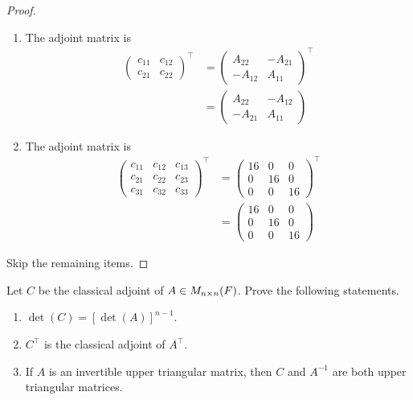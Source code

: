 \begin{proof} \ 

\begin{enumerate}
\item The adjoint matrix is
\begin{align*}
    \begin{pmatrix} c_{11} & c_{12} \\ c_{21} & c_{22} \end{pmatrix}^\top
        & = \begin{pmatrix} A_{22} & -A_{21} \\ -A_{12} & A_{11} \end{pmatrix}^\top \\
        & = \begin{pmatrix} A_{22} & -A_{12} \\ -A_{21} & A_{11} \end{pmatrix}
\end{align*}

\item The adjoint matrix is
\begin{align*}
    \begin{pmatrix} c_{11} & c_{12} & c_{13} \\ c_{21} & c_{22} & c_{23} \\ c_{31} & c_{32} & c_{33} \end{pmatrix}^\top
        & = \begin{pmatrix} 16 & 0 & 0 \\ 0 & 16 & 0 \\ 0 & 0 & 16 \end{pmatrix}^\top \\
        & = \begin{pmatrix} 16 & 0 & 0 \\ 0 & 16 & 0 \\ 0 & 0 & 16 \end{pmatrix}
\end{align*}
\end{enumerate}

Skip the remaining items.
\end{proof}

\begin{exercise} \label{exercise 4.3.27}
Let \(C\) be the classical adjoint of \(A \in M_{n \times n}(F)\).
Prove the following statements.
\begin{enumerate}
\item \(\det(C) = [\det(A)]^{n-1}\).
\item \(C^\top\) is the classical adjoint of \(A^\top\).
\item If \(A\) is an invertible upper triangular matrix, then \(C\) and \(A^{-1}\) are both upper triangular matrices.
\end{enumerate}
\end{exercise}

